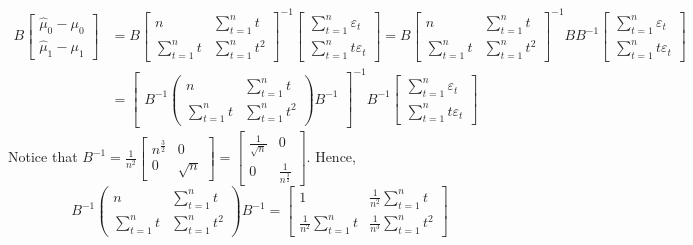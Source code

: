 \documentclass[]{article}
\begin{document}
\begin{enumerate}[label=(\alph*)]
\begin{equation}
\begin{split}
	B\begin{bmatrix}\hat{\mu}_0 - \mu_0 \\ \hat{\mu}_1 - \mu_1\end{bmatrix}& = B\begin{bmatrix}n & \sum\limits_{t = 1}^nt \\ \sum\limits_{t = 1}^nt & \sum\limits_{t = 1}^nt^2\end{bmatrix}^{-1}\begin{bmatrix}\sum\limits_{t = 1}^n\varepsilon_t \\ \sum\limits_{t = 1}^nt\varepsilon_t\end{bmatrix} = B\begin{bmatrix}n & \sum\limits_{t = 1}^nt \\ \sum\limits_{t = 1}^nt & \sum\limits_{t = 1}^nt^2\end{bmatrix}^{-1}BB^{-1}\begin{bmatrix}\sum\limits_{t = 1}^n\varepsilon_t \\ \sum\limits_{t = 1}^nt\varepsilon_t\end{bmatrix} \nonumber \\
	& = \begin{bmatrix}
	B^{-1}\begin{pmatrix}n & \sum\limits_{t = 1}^nt \\ \sum\limits_{t = 1}^nt & \sum\limits_{t = 1}^nt^2\end{pmatrix}B^{-1}\end{bmatrix}^{-1} B^{-1}\begin{bmatrix}\sum\limits_{t = 1}^n\varepsilon_t \\ \sum\limits_{t = 1}^nt\varepsilon_t\end{bmatrix}
	\end{split}
	\end{equation}
	Notice that $B^{-1} = \frac{1}{n^2}\begin{bmatrix}n^{\frac{3}{2}} & 0 \\ 0 & \sqrt{n}\end{bmatrix} = \begin{bmatrix}\frac{1}{\sqrt{n}} & 0 \\ 0 & \frac{1}{n^{\frac{3}{2}}}\end{bmatrix}$. Hence,
	\begin{equation}
	B^{-1}\begin{pmatrix}n & \sum\limits_{t = 1}^nt \\ \sum\limits_{t = 1}^nt & \sum\limits_{t = 1}^nt^2\end{pmatrix}B^{-1} = \begin{bmatrix}1 & \frac{1}{n^2}\sum\limits_{t = 1}^nt \\ \frac{1}{n^2}\sum\limits_{t = 1}^nt & \frac{1}{n^3}\sum\limits_{t = 1}^nt^2\end{bmatrix}\nonumber
	\end{equation}
	

\end{enumerate}
\end{document}
